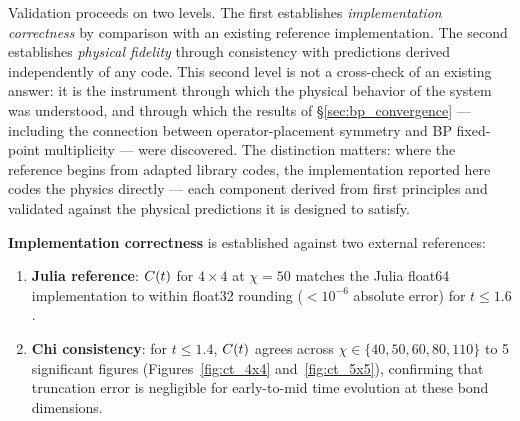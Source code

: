 Validation proceeds on two levels.
The first establishes \emph{implementation correctness} by comparison with an
existing reference implementation.
The second establishes \emph{physical fidelity} through consistency with
predictions derived independently of any code.
This second level is not a cross-check of an existing answer: it is the
instrument through which the physical behavior of the system was understood,
and through which the results of \S\ref{sec:bp_convergence} --- including the
connection between operator-placement symmetry and BP fixed-point multiplicity
--- were discovered.
The distinction matters: where the reference begins from adapted library codes,
the implementation reported here codes the physics directly --- each component
derived from first principles and validated against the physical predictions it
is designed to satisfy.

\medskip
\noindent\textbf{Implementation correctness} is established against two external references:
\begin{enumerate}
  \item \textbf{Julia reference}: $C(t)$ for $4\times4$ at $\chi=50$ matches the
        Julia float64 implementation to within float32 rounding
        ($<10^{-6}$ absolute error) for $t \leq 1.6$.
  \item \textbf{Chi consistency}: for $t \leq 1.4$, $C(t)$ agrees across
        $\chi \in \{40, 50, 60, 80, 110\}$ to 5 significant figures
        (Figures~\ref{fig:ct_4x4} and~\ref{fig:ct_5x5}), confirming that truncation error is negligible
        for early-to-mid time evolution at these bond dimensions.
\end{enumerate}

